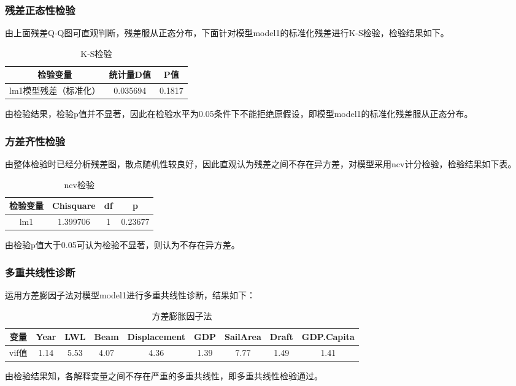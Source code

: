 \documentclass[a4paper,12pt,onecolumn,oneside]{article}
\begin{document}
\subsubsection{残差正态性检验}
由上面残差Q-Q图可直观判断，残差服从正态分布，下面针对模型model1的标准化残差进行K-S检验，检验结果如下。\par 
\begin{table}[h]
	\centering
	\caption{K-S检验}\vspace{0.25\baselineskip}
	\begin{tabular}{ccc}
		\toprule
		检验变量 & 统计量D值 & P值 \\
		\midrule
		lm1模型残差（标准化） & 0.035694 & 0.1817 \\
		\bottomrule
	\end{tabular}
\end{table}
由检验结果，检验p值并不显著，因此在检验水平为0.05条件下不能拒绝原假设，即模型model1的标准化残差服从正态分布。
\subsubsection{方差齐性检验}
由整体检验时已经分析残差图，散点随机性较良好，因此直观认为残差之间不存在异方差，对模型采用ncv计分检验，检验结果如下表。\par 
\begin{table}[h]
	\centering
	\caption{ncv检验}\vspace{0.25\baselineskip}
	\label{tab:ncv}
	\begin{tabular}{ccc c}
		\toprule
		检验变量 & Chisquare & df & p \\
		\midrule
		lm1 & 1.399706 & 1 & 0.23677 \\
		\bottomrule
	\end{tabular}
\end{table}
由检验p值大于0.05可认为检验不显著，则认为不存在异方差。
\subsubsection{多重共线性诊断}
运用方差膨因子法对模型model1进行多重共线性诊断，结果如下：\par 
\begin{table}[h]
	\centering
	\caption{方差膨胀因子法}\vspace{0.25\baselineskip}
	\begin{tabular}{ccccccccc}
		\toprule
		变量 & Year & LWL & Beam & Displacement & GDP & SailArea & Draft & GDP.Capita \\\hline
		vif值 & 1.14 & 5.53 & 4.07 & 4.36 & 1.39 & 7.77 & 1.49 & 1.41 \\
		\bottomrule
	\end{tabular}
\end{table}
由检验结果知，各解释变量之间不存在严重的多重共线性，即多重共线性检验通过。
\end{document}

